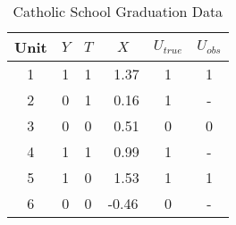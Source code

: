 \documentclass{article}
\begin{document}
\begin{table}[!h]
		\caption{Catholic School Graduation Data}
	\begin{center}
		\begin{tabular}{cccc|cc}
                  Unit & $Y$ & $T$ & $X$ & $U_{true}$ & $U_{obs}$\\ \hline  
                  1    & 1     & 1   &\ 1.37   & 1   & 1  \\ 
                  2    & 0     & 1   &\ 0.16   & 1    & -\\ 
                  3    & 0    &  0    &\ 0.51   & 0   & 0\\ 
                  4    & 1    &  1    &\ 0.99   & 1  & - \\ 
                  5   &  1    &  0    &\ 1.53   & 1   & 1\\ 
                  6  &  0     &  0     &-0.46   & 0  & -\\ 

		\end{tabular}
		\label{}
	\end{center}
\end{table}
\end{document}
